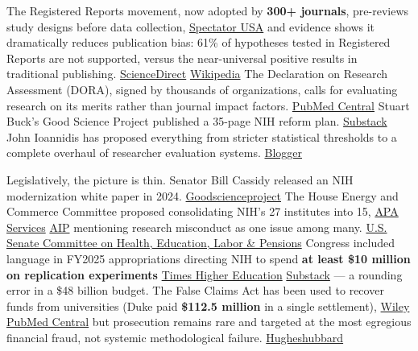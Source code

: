 The Registered Reports movement, now adopted by \textbf{300+ journals}, pre-reviews study designs before data collection, \href{https://spectator.us/bad-science-coronavirus/}{Spectator USA} and evidence shows it dramatically reduces publication bias: 61\% of hypotheses tested in Registered Reports are not supported, versus the near-universal positive results in traditional publishing. \href{https://www.sciencedirect.com/topics/psychology/preregistered}{ScienceDirect} \href{https://en.wikipedia.org/wiki/Replication_crisis}{Wikipedia} The Declaration on Research Assessment (DORA), signed by thousands of organizations, calls for evaluating research on its merits rather than journal impact factors. \href{https://pmc.ncbi.nlm.nih.gov/articles/PMC5206685/}{PubMed Central} Stuart Buck's Good Science Project published a 35-page NIH reform plan. \href{https://goodscience.substack.com/p/new-in-metascience-and-good-government}{Substack} John Ioannidis has proposed everything from stricter statistical thresholds to a complete overhaul of researcher evaluation systems. \href{http://backreaction.blogspot.com/2018/11/book-review-rigor-mortis-by-richard.html}{Blogger}

Legislatively, the picture is thin. Senator Bill Cassidy released an NIH modernization white paper in 2024. \href{https://goodscienceproject.org/articles/metascience-reforms-at-nih-2/}{Goodscienceproject} The House Energy and Commerce Committee proposed consolidating NIH's 27 institutes into 15, \href{https://www.apaservices.org/advocacy/news/opposing-nih-radical-reorganization}{APA Services} \href{https://ww2.aip.org/fyi/republicans-push-nih-reform}{AIP} mentioning research misconduct as one issue among many. \href{https://www.help.senate.gov/imo/media/doc/nih_modernization_5924pdf.pdf}{U.S. Senate Committee on Health, Education, Labor \& Pensions} Congress included language in FY2025 appropriations directing NIH to spend \textbf{at least \$10 million on replication experiments} \href{https://www.timeshighereducation.com/news/congress-pushes-nih-review-reproducibility-and-near-misses}{Times Higher Education} \href{https://goodscience.substack.com/p/metascience-reforms-at-nih}{Substack} --- a rounding error in a \$48 billion budget. The False Claims Act has been used to recover funds from universities (Duke paid \textbf{\$112.5 million} in a single settlement), \href{https://www.wiley.law/newsletter-Got-Grants-Public-andPrivate-Sector-Federal-Grant-Recipients-Not-Immune-to-False-Claims-Act-Liability}{Wiley} \href{https://pmc.ncbi.nlm.nih.gov/articles/PMC8247552/}{PubMed Central} but prosecution remains rare and targeted at the most egregious financial fraud, not systemic methodological failure. \href{https://www.hugheshubbard.com/news/second-circuit-ratchets-up-false-claims-act-exposure-for-grant-recipients}{Hugheshubbard}

